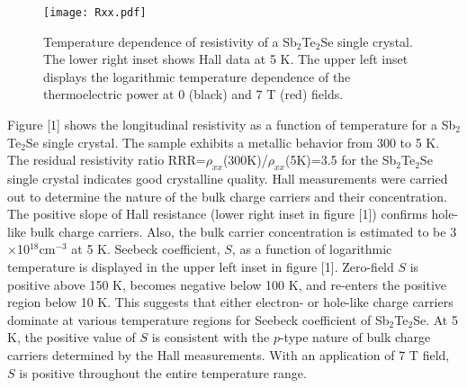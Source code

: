 \documentclass[aps,prb,twocolumn,showpacs,groupedaddress]{revtex4-1}
\begin{document}
\begin{figure}
  \centering
  \texttt{[image: Rxx.pdf]}
  \caption{Temperature dependence of resistivity of a Sb$_2$Te$_2$Se single crystal. The lower right inset shows Hall data at 5 K. The upper left inset displays the logarithmic temperature dependence of the thermoelectric power at 0 (black) and 7 T (red) fields.}\label{Resistivity}
\end{figure}
Figure [1] shows the longitudinal resistivity as a function of temperature for a Sb$_2$Te$_2$Se single crystal. The sample exhibits a metallic behavior from 300 to 5 K. The residual resistivity ratio RRR=$\rho_{xx}$(300K)/$\rho_{xx}$(5K)=3.5 for the Sb$_2$Te$_2$Se single crystal indicates good crystalline quality. Hall measurements were carried out to determine the nature of the bulk charge carriers and their concentration. The positive slope of Hall resistance (lower right inset in figure [1]) confirms hole-like bulk charge carriers. Also, the bulk carrier concentration is estimated to be 3$\times$10$^{18}$cm$^{-3}$ at 5 K. Seebeck coefficient, $S$, as a function of logarithmic temperature is displayed in the upper left inset in figure [1]. Zero-field $S$ is positive above 150 K, becomes negative below 100 K, and re-enters the positive region below 10 K. This suggests that either electron- or hole-like charge carriers dominate at various temperature regions for Seebeck coefficient of Sb$_2$Te$_2$Se. At 5 K, the positive value of $S$ is consistent with the $p$-type nature of bulk charge carriers determined by the Hall measurements. With an application of 7 T field, $S$ is positive throughout the entire temperature range.
\end{document}
